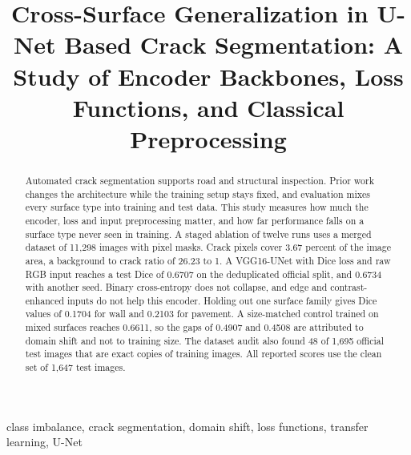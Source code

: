 \documentclass[conference]{IEEEtran}
\begin{document}
\title{Cross-Surface Generalization in U-Net Based Crack Segmentation: A Study of Encoder Backbones, Loss Functions, and Classical Preprocessing}

\author{
\and
{}
}

\maketitle

\begin{abstract}
Automated crack segmentation supports road and structural inspection. Prior work changes the architecture while the training setup stays fixed, and evaluation mixes every surface type into training and test data. This study measures how much the encoder, loss and input preprocessing matter, and how far performance falls on a surface type never seen in training. A staged ablation of twelve runs uses a merged dataset of 11,298 images with pixel masks. Crack pixels cover 3.67 percent of the image area, a background to crack ratio of 26.23 to 1. A VGG16-UNet with Dice loss and raw RGB input reaches a test Dice of 0.6707 on the deduplicated official split, and 0.6734 with another seed. Binary cross-entropy does not collapse, and edge and contrast-enhanced inputs do not help this encoder. Holding out one surface family gives Dice values of 0.1704 for wall and 0.2103 for pavement. A size-matched control trained on mixed surfaces reaches 0.6611, so the gaps of 0.4907 and 0.4508 are attributed to domain shift and not to training size. The dataset audit also found 48 of 1,695 official test images that are exact copies of training images. All reported scores use the clean set of 1,647 test images.
\end{abstract}

\begin{IEEEkeywords}
class imbalance, crack segmentation, domain shift, loss functions, transfer learning, U-Net
\end{IEEEkeywords}
\end{document}
